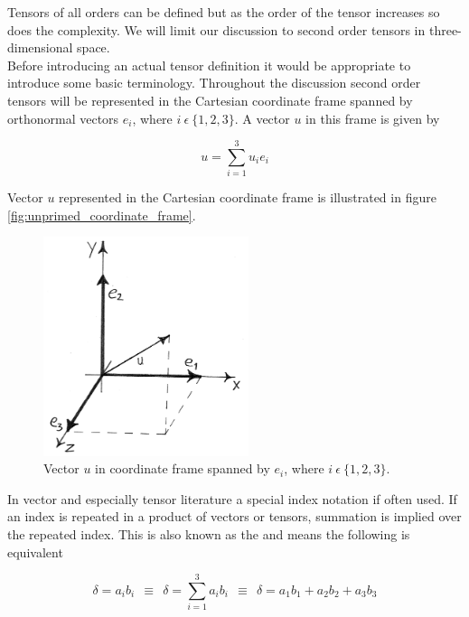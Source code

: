 Tensors of all orders can be defined but
as the order of the tensor increases so does the complexity. We will
limit our discussion to second order tensors in three-dimensional
space. \\


Before introducing an actual tensor definition it would be appropriate to
introduce some basic terminology. Throughout the discussion second order tensors will be
represented in the Cartesian coordinate frame spanned by orthonormal
vectors $e_i$, where $i \ \epsilon \ \lbrace 1,2,3 \rbrace$. A vector 
$u$ in this frame is given by 

\begin{equation}
\label{eq:bathe_2_48}
u = \sum^3_{i=1} u_i e_i
\end{equation}

Vector $u$ represented in the Cartesian coordinate frame is
illustrated in figure \vref{fig:unprimed_coordinate_frame}. 
\begin{figure}
  \centering
  \includegraphics[width=6cm]{./images/mathematics_unprimed_cf.png}
\caption{Vector $u$ in coordinate frame spanned by $e_i$, where $i \ \epsilon \ \lbrace 1,2,3 \rbrace$.}
\label{fig:unprimed_coordinate_frame}
\end{figure}

In vector and especially tensor literature a special index
notation if often used. If an index is repeated in a product of
vectors or tensors, summation is implied over the repeated index. This
is also known as the  and means the following
is equivalent

\begin{equation}
\delta = a_ib_i \ \ \equiv \ \ \delta = \sum^3_{i=1} a_ib_i \ \
\equiv \ \ \delta = a_1b_1 + a_2b_2 + a_3b_3 
\end{equation} \\

